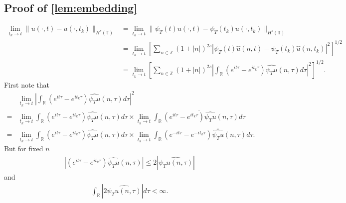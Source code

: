 \documentclass[12pt,reqno]{amsart}
\numberwithin{equation}{section}  %
\numberwithin{figure}{section}
\newcommand{\rr}{\mathbb{R}}
\newcommand{\zz}{\mathbb{Z}}
\newcommand{\ci}{\mathbb{T}}
\newcommand{\wh}{\widehat}
\theoremstyle{plain}
\theoremstyle{definition}
\theoremstyle{remark}
\begin{document}
\subsection{Proof of \autoref{lem:embedding}}
%
%
\begin{equation}
  \label{dm}
	\begin{split}
		\lim_{t_{k} \to t} \|u(\cdot, t) - u(\cdot, t_{k})\|_{H^s(\ci)} 
    & = \lim_{t_{k} \to t} \|\psi_{T}(t) u(\cdot, t) - \psi_{T}(t_{k}) u(\cdot, t_{k})\|_{H^s(\ci)} 
		\\
		& = \lim_{t_{k} \to t} \left[ \sum_{n \in \zz}\left( 1 + | n |
    \right)^{2s} | \psi_{T}(t)  \wh{u}(n, t) - \psi_{T}(t_{k}) \wh{ u}(n, t_{k}) |^2 \right]^{1/2}
		\\
		& = \lim_{t_{k} \to t} \left[ \sum_{n \in \zz} \left( 1 + | n |
    \right)^{2s} | \int_{\rr} (e^{it \tau} - e^{it_{k} \tau})
    \wh{\psi_{T} u}(n,
		\tau) d \tau |^2 \right]^{1/2}.
	\end{split}
\end{equation}
First note that
%
%
%
%
\begin{equation*}
\begin{split}
& \lim_{t_{k} \to t}  | \int_{\rr} (e^{it \tau} - e^{it_{k} \tau})
    \wh{\psi_{T} u}(n,
		\tau) d \tau |^2 
    \\
    = 
     & \lim_{t_{k} \to t}  \int_{\rr} (e^{it \tau} - e^{it_{k} \tau})
    \wh{\psi_{T} u}(n,
    \tau) d \tau \times \lim_{t_{k} \to t} \overline{\int_{\rr} (e^{it \tau} - e^{it_{k} \tau})
    \wh{\psi_{T} u}(n,
    \tau) d \tau }  
    \\
    = 
    &  \lim_{t_{k} \to t}  \int_{\rr} (e^{it \tau} - e^{it_{k} \tau})
    \wh{\psi_{T} u}(n,
    \tau) d \tau \times \lim_{t_{k} \to t} \int_{\rr} (e^{-it \tau} - e^{-it_{k} \tau})
    \overline{\wh{\psi_{T} u}}(n,
    \tau) d \tau.   
    \end{split}
\end{equation*}
%
%
But for fixed $n$ 
%
%
\begin{equation*}
\begin{split}
|(e^{it \tau} - e^{it_{k} \tau})  
    \wh{\psi_{T} u}(n, \tau) | \le 2 |\wh{\psi_{T} u(n, \tau)} |
\end{split}
\end{equation*}
%
%
and
%
%
%
\begin{equation*}
\begin{split}
  \int_{\rr} |2 \wh{\psi_{T} u(n, \tau)} | d \tau < \infty.
\end{split}
\end{equation*}
\end{document}
